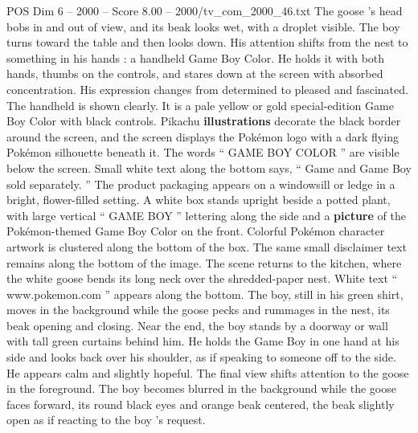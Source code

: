 \begin{textsample}{POS Dim 6 – 2000 – Score 8.00 – 2000/tv\_com\_2000\_46.txt}
The goose ’s head bobs in and out of view, and its beak looks wet, with a droplet visible.
The boy turns toward the table and then looks down.
His attention shifts from the nest to something in his hands : a handheld Game Boy Color.
He holds it with both hands, thumbs on the controls, and stares down at the screen with absorbed concentration.
His expression changes from determined to pleased and fascinated.
The handheld is shown clearly.
It is a pale yellow or gold special-edition Game Boy Color with black controls.
Pikachu \textbf{illustrations} decorate the black border around the screen, and the screen displays the Pokémon logo with a dark flying Pokémon silhouette beneath it.
The words “ GAME BOY COLOR ” are visible below the screen.
Small white text along the bottom says, “ Game and Game Boy sold separately. ” The product packaging appears on a windowsill or ledge in a bright, flower-filled setting.
A white box stands upright beside a potted plant, with large vertical “ GAME BOY ” lettering along the side and a \textbf{picture} of the Pokémon-themed Game Boy Color on the front.
Colorful Pokémon character artwork is clustered along the bottom of the box.
The same small disclaimer text remains along the bottom of the image.
The scene returns to the kitchen, where the white goose bends its long neck over the shredded-paper nest.
White text “ www.pokemon.com ” appears along the bottom.
The boy, still in his green shirt, moves in the background while the goose pecks and rummages in the nest, its beak opening and closing.
Near the end, the boy stands by a doorway or wall with tall green curtains behind him.
He holds the Game Boy in one hand at his side and looks back over his shoulder, as if speaking to someone off to the side.
He appears calm and slightly hopeful.
The final view shifts attention to the goose in the foreground.
The boy becomes blurred in the background while the goose faces forward, its round black eyes and orange beak centered, the beak slightly open as if reacting to the boy ’s request.

\end{textsample}
